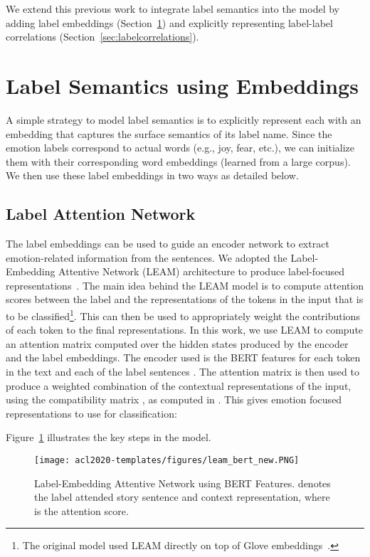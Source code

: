\documentclass[11pt,a4paper]{article}
\begin{document}
We extend this previous work to integrate label semantics into the model by adding label embeddings (Section~\ref{sec:labelembeddings}) and explicitly representing label-label correlations (Section~\ref{sec:labelcorrelations}).


\section{Label Semantics using Embeddings}
\label{sec:labelembeddings}

A simple strategy to model label semantics is to explicitly represent each with an embedding that captures the surface semantics of its label name. Since the emotion labels correspond to actual words (e.g., joy, fear, etc.), we can initialize them with their corresponding word embeddings (learned from a large corpus). We then use these label embeddings in two ways as detailed below.

\subsection{Label Attention Network}
The label embeddings can be used to guide an encoder network to extract emotion-related information from the sentences. We adopted the Label-Embedding Attentive Network (LEAM) architecture to produce label-focused representations~\cite{wang2018joint}. The main idea behind the LEAM model is to compute attention scores between the label and the representations of the tokens in the input that is to be classified\footnote{The original model used LEAM directly on top of Glove embeddings~\cite{wang2018joint}.}. This can then be used to appropriately weight the contributions of each token to the final representations. In this work, we use LEAM to compute an attention matrix computed over the hidden states produced by the encoder and the label embeddings. The encoder used is the BERT features for each token  in the text and each of the label sentences . The attention matrix is then used to produce a weighted combination of the contextual representations of the input, using the compatibility matrix , as computed in \cite{wang2018joint}. This gives emotion focused representations  to use for classification: 


Figure~\ref{fig:leam_bert} illustrates the key steps in the model.
  \begin{figure}
    
    \texttt{[image: acl2020-templates/figures/leam\_bert\_new.PNG]}
    \caption{Label-Embedding Attentive Network using BERT Features.  denotes the label attended story sentence and context representation, where  is the attention score.
    }\label{fig:leam_bert}
  \end{figure}
  
\end{document}
